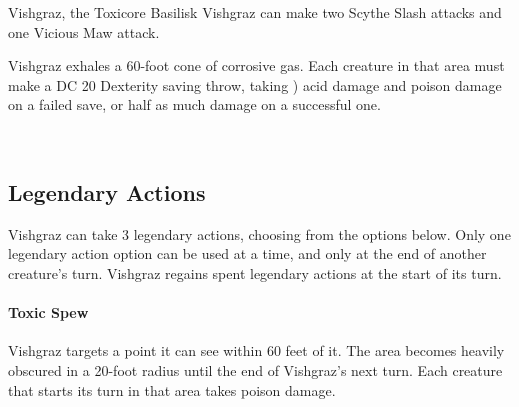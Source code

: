 \begin{DndMonster}[width=0.5\textwidth]{Vishgraz, the Toxicore Basilisk}
	Vishgraz can make two Scythe Slash attacks and one Vicious Maw attack.
	
	\DndMonsterAttack[
      name=Scythe Slash,
      distance=melee, %
      mod=+14,
      reach=10,
      targets=one target,
      dmg=\DndDice{3d8 + 7},
      dmg-type=slashing,
      plus-dmg=\DndDice{7d6},
      plus-dmg-type=poison,
      extra={. The target must succeed on a DC 20 Constitution saving throw or be poisoned for 1 minute. The poisoned creature can repeat the saving throw at the end of each of its turns, ending the effect on itself on a success},
    ]
    
    \DndMonsterAttack[
      name=Vicious Maw,
      distance=melee, %
      mod=+14,
      reach=10,
      targets=one target,
      dmg=\DndDice{3d6 + 7},
      dmg-type=slashing,
      or-dmg=\DndDice{6d6 + 7},
      or-dmg-when={if creature is already poisoned},
    ]
    
	Vishgraz exhales a 60-foot cone of corrosive gas. Each creature in that area must make a DC 20 Dexterity saving throw, taking ) acid damage and  poison damage on a failed save, or half as much damage on a successful one.
      
\end{DndMonster}

\vfill\eject %

\hfil\\\vspace*{5cm}
\subsection*{Legendary Actions}
Vishgraz can take 3 legendary actions, choosing from the options below. Only one legendary action option can be used at a time, and only at the end of another creature's turn. Vishgraz regains spent legendary actions at the start of its turn.
\paragraph{Toxic Spew} Vishgraz targets a point it can see within 60 feet of it. The area becomes heavily obscured in a 20-foot radius until the end of Vishgraz's next turn. Each creature that starts its turn in that area takes  poison damage.

